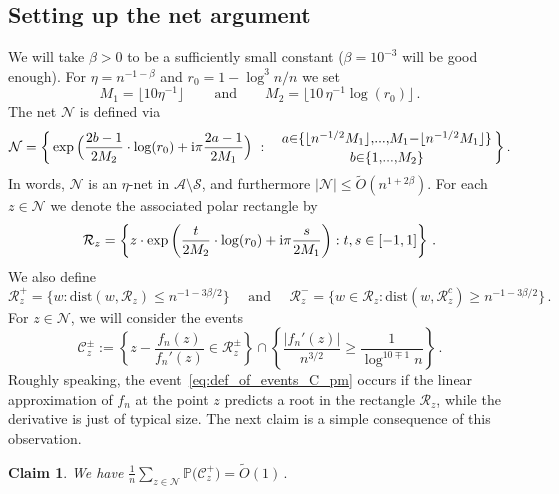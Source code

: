 \documentclass[11pt]{amsart}
\newtheorem{claim}[theorem]{Claim}
\theoremstyle{remark}
\theoremstyle{definition}
\newcommand{\cR}{\mathcal R}
\newcommand{\bP}{\mathbb P}
\newcommand{\cA}{\mathcal A}
\newcommand{\cC}{\mathcal C}
\newcommand{\cN}{\mathcal N}
\newcommand{\I}{{\rm i}}
\begin{document}
    \subsection{Setting up the net argument}
    We will take $\beta > 0$ to be a sufficiently small constant ($\beta = 10^{-3}$ will be good enough). For $\eta = n^{-1-\beta}$ and $r_0 = 1 - \log^3 n / n$ we set 
    \[
    M_1 = \lfloor  10 \eta^{-1} \rfloor\, \qquad \text{and} \qquad M_2 = \lfloor 10 \, \eta^{-1} \log (r_0) \rfloor \, .  
    \]
    The net $\mathcal{N}$ is defined via
    \begin{equation*}
            \cN = \bigg\{   \exp\Big( \frac{2b - 1}{2M_2} \cdot \log(r_0) + \I \pi \frac{2a - 1}{2M_1}  \Big) \  : \quad   {\Large \substack{ a \in \{\lfloor n^{-1/2} M_1 \rfloor,\ldots,M_1 - \lfloor n^{-1/2} M_1 \rfloor \} \\[0.2em] b \in \{1,\ldots,M_2 \} } } \, \bigg\}\,.
    \end{equation*}
    In words, $\mathcal{N}$ is an $\eta$-net in $\cA\setminus \mathcal{S}$, and furthermore $|\mathcal{N}| \le \widetilde{O}(n^{1+2\beta})$. For each $z\in \mathcal{N}$ we denote the associated polar rectangle by
    $$\cR_z = \left\{ z \cdot \exp\left( \frac{t}{2M_2} \cdot \log(r_0) + \I \pi  \frac{s}{2M_1}  \right) : t,s \in [-1,1] \right\}\,.  $$
    We also define
    $$\cR_z^+ = \big\{w : \mathrm{dist}(w,\cR_z) \leq n^{-1-3\beta/2} \big\} \quad \text{ and }\quad \cR_z^- = \big\{w \in \cR_z : \mathrm{dist}(w,\cR_z^c) \geq n^{-1-3\beta/2}\big\}\,.$$ 
    For $z\in \mathcal{N}$, we will consider the events 
    \begin{equation}
        \label{eq:def_of_events_C_pm}
        \cC_z^{\pm} := \left\{z - \frac{f_n(z)}{f_n'(z)} \in \cR_z^{\pm}\right\} \cap \left\{\frac{|f_n'(z)|}{n^{3/2}} \geq \frac{1}{\log^{10 \mp 1} n} \right\} \, . 
    \end{equation}
    Roughly speaking, the event~\eqref{eq:def_of_events_C_pm} occurs if the linear approximation of $f_n$ at the point $z$ predicts a root in the rectangle $\cR_z$, while the derivative is just of typical size. The next claim is a simple consequence of this observation.
    
    \begin{claim}
        \label{claim:sum_of_probabilities_over_net_points_is_bounded}
        We have
        $
        \displaystyle \frac{1}{n} \sum_{z\in \cN} \bP\big(\cC_z^+ \big) = \widetilde{O }(1) \, . 
        $
    \end{claim}
    \noindent
\end{document}
